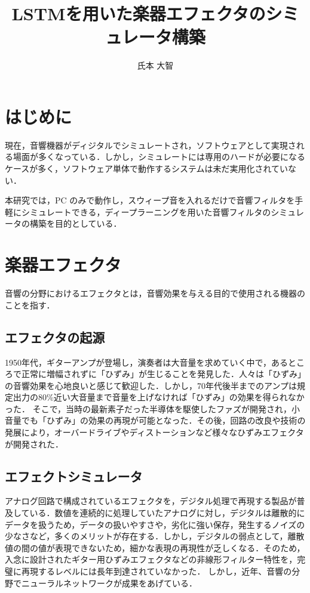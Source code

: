 \documentclass{jreport}		%
\title{LSTMを用いた楽器エフェクタのシミュレータ構築}	%
\author{氏本 大智}			%
\begin{document}
%
\maketitle		%
\tableofcontents	%

\chapter{はじめに}
現在，音響機器がディジタルでシミュレートされ，ソフトウェアとして実現される場面が多くなっている．しかし，シミュレートには専用のハードが必要になるケースが多く，ソフトウェア単体で動作するシステムは未だ実用化されていない．

本研究では，PC のみで動作し，スウィープ音を入れるだけで音響フィルタを手軽にシミュレートできる，ディープラーニングを用いた音響フィルタのシミュレータの構築を目的としている．

\chapter{楽器エフェクタ}
音響の分野におけるエフェクタとは，音響効果を与える目的で使用される機器のことを指す．

\section{エフェクタの起源}
1950年代，ギターアンプが登場し，演奏者は大音量を求めていく中で，あるところで正常に増幅されずに「ひずみ」が生じることを発見した．人々は「ひずみ」の音響効果を心地良いと感じて歓迎した．しかし，70年代後半までのアンプは規定出力の80\%近い大音量まで音量を上げなければ「ひずみ」の効果を得られなかった．
そこで，当時の最新素子だった半導体を駆使したファズが開発され，小音量でも「ひずみ」の効果の再現が可能となった．その後，回路の改良や技術の発展により，オーバードライブやディストーションなど様々なひずみエフェクタが開発された．

\section{エフェクトシミュレータ}
アナログ回路で構成されているエフェクタを，デジタル処理で再現する製品が普及している．数値を連続的に処理していたアナログに対し，デジタルは離散的にデータを扱うため，データの扱いやすさや，劣化に強い保存，発生するノイズの少なさなど，多くのメリットが存在する．しかし，デジタルの弱点として，離散値の間の値が表現できないため，細かな表現の再現性が乏しくなる．そのため，入念に設計されたギター用ひずみエフェクタなどの非線形フィルター特性を，完璧に再現するレベルには長年到達されていなかった．
しかし，近年、音響の分野でニューラルネットワークが成果をあげている．
\end{document}
